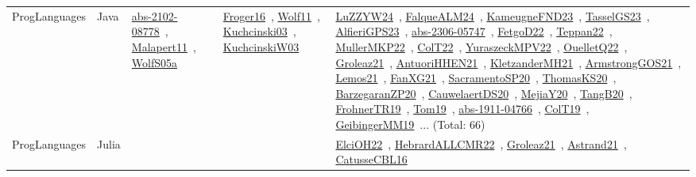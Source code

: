 {\begin{longtable}{lp{3cm}>{\raggedright\arraybackslash}p{6cm}>{\raggedright\arraybackslash}p{6cm}>{\raggedright\arraybackslash}p{8cm}}
ProgLanguages & Java & \href{../works/abs-2102-08778.pdf}{abs-2102-08778}~\cite{abs-2102-08778}, \href{../works/Malapert11.pdf}{Malapert11}~\cite{Malapert11}, \href{../works/WolfS05a.pdf}{WolfS05a}~\cite{WolfS05a} & \href{../works/Froger16.pdf}{Froger16}~\cite{Froger16}, \href{../works/Wolf11.pdf}{Wolf11}~\cite{Wolf11}, \href{../works/Kuchcinski03.pdf}{Kuchcinski03}~\cite{Kuchcinski03}, \href{../works/KuchcinskiW03.pdf}{KuchcinskiW03}~\cite{KuchcinskiW03} & \href{../works/LuZZYW24.pdf}{LuZZYW24}~\cite{LuZZYW24}, \href{../works/FalqueALM24.pdf}{FalqueALM24}~\cite{FalqueALM24}, \href{../works/KameugneFND23.pdf}{KameugneFND23}~\cite{KameugneFND23}, \href{../works/TasselGS23.pdf}{TasselGS23}~\cite{TasselGS23}, \href{../works/AlfieriGPS23.pdf}{AlfieriGPS23}~\cite{AlfieriGPS23}, \href{../works/abs-2306-05747.pdf}{abs-2306-05747}~\cite{abs-2306-05747}, \href{../works/FetgoD22.pdf}{FetgoD22}~\cite{FetgoD22}, \href{../works/Teppan22.pdf}{Teppan22}~\cite{Teppan22}, \href{../works/MullerMKP22.pdf}{MullerMKP22}~\cite{MullerMKP22}, \href{../works/ColT22.pdf}{ColT22}~\cite{ColT22}, \href{../works/YuraszeckMPV22.pdf}{YuraszeckMPV22}~\cite{YuraszeckMPV22}, \href{../works/OuelletQ22.pdf}{OuelletQ22}~\cite{OuelletQ22}, \href{../works/Groleaz21.pdf}{Groleaz21}~\cite{Groleaz21}, \href{../works/AntuoriHHEN21.pdf}{AntuoriHHEN21}~\cite{AntuoriHHEN21}, \href{../works/KletzanderMH21.pdf}{KletzanderMH21}~\cite{KletzanderMH21}, \href{../works/ArmstrongGOS21.pdf}{ArmstrongGOS21}~\cite{ArmstrongGOS21}, \href{../works/Lemos21.pdf}{Lemos21}~\cite{Lemos21}, \href{../works/FanXG21.pdf}{FanXG21}~\cite{FanXG21}, \href{../works/SacramentoSP20.pdf}{SacramentoSP20}~\cite{SacramentoSP20}, \href{../works/ThomasKS20.pdf}{ThomasKS20}~\cite{ThomasKS20}, \href{../works/BarzegaranZP20.pdf}{BarzegaranZP20}~\cite{BarzegaranZP20}, \href{../works/CauwelaertDS20.pdf}{CauwelaertDS20}~\cite{CauwelaertDS20}, \href{../works/MejiaY20.pdf}{MejiaY20}~\cite{MejiaY20}, \href{../works/TangB20.pdf}{TangB20}~\cite{TangB20}, \href{../works/FrohnerTR19.pdf}{FrohnerTR19}~\cite{FrohnerTR19}, \href{../works/Tom19.pdf}{Tom19}~\cite{Tom19}, \href{../works/abs-1911-04766.pdf}{abs-1911-04766}~\cite{abs-1911-04766}, \href{../works/ColT19.pdf}{ColT19}~\cite{ColT19}, \href{../works/GeibingerMM19.pdf}{GeibingerMM19}~\cite{GeibingerMM19}... (Total: 66)\\
ProgLanguages & Julia &  &  & \href{../works/ElciOH22.pdf}{ElciOH22}~\cite{ElciOH22}, \href{../works/HebrardALLCMR22.pdf}{HebrardALLCMR22}~\cite{HebrardALLCMR22}, \href{../works/Groleaz21.pdf}{Groleaz21}~\cite{Groleaz21}, \href{../works/Astrand21.pdf}{Astrand21}~\cite{Astrand21}, \href{../works/CatusseCBL16.pdf}{CatusseCBL16}~\cite{CatusseCBL16}\\

\end{longtable}}
